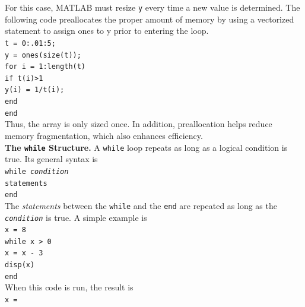 \documentclass[../main.tex]{subfiles}
\begin{document}
\noindent For this case, MATLAB must resize \texttt{y} every time a new value is determined. The following
code preallocates the proper amount of memory by using a vectorized statement to
assign ones to y prior to entering the loop.\\

\texttt{t = 0:.01:5;\\
\indent y = ones(size(t));\\
\indent for i = 1:length(t)\\
\indent\hspace{2mm} if t(i)>1\\
\indent\hspace{4mm} y(i) = 1/t(i);\\
\indent\hspace{2mm} end\\
\indent end}\\

\noindent Thus, the array is only sized once. In addition, preallocation helps reduce memory fragmentation,
which also enhances efficiency.\\

\noindent\textbf{The \texttt{while} Structure.} A \texttt{while} loop repeats as long as a logical condition is true. Its
general syntax is\\

\texttt{while \emph{condition}\\
\indent\hspace{2mm} statements\\
\indent end}\\

\noindent The \emph{statements} between the \texttt{while} and the \texttt{end} are repeated as long as the \texttt{\emph{condition}} is
true. A simple example is\\

\texttt{x = 8\\
\indent while x > 0\\
\indent\hspace{2mm} x = x - 3\\
\indent\hspace{2mm} disp(x)\\
\indent end}\\

\noindent When this code is run, the result is\\

\texttt{x =\\
\indent{}\\
\indent{}\\
\indent{}\\
\indent{}}\\
\end{document}
